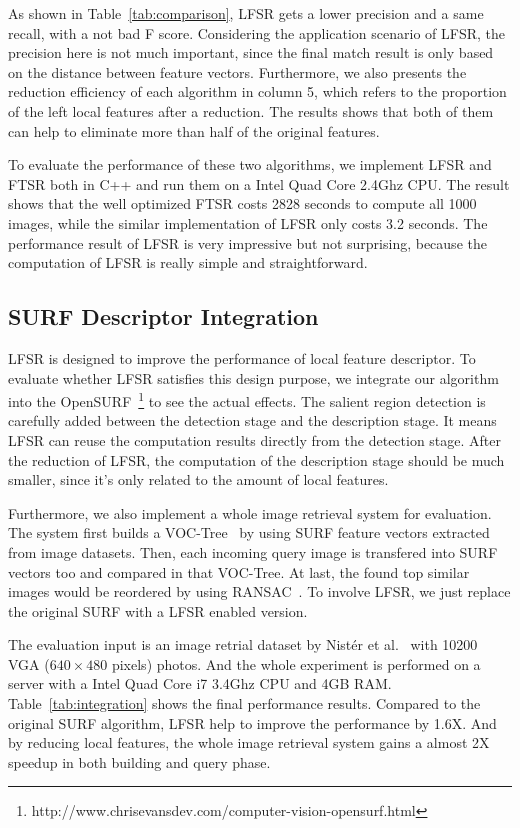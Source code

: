 As shown in Table~\ref{tab:comparison}, LFSR gets a lower precision and a same recall, with a not bad F score. Considering the application scenario of LFSR, the precision here is not much important, since the final match result is only based on the distance between feature vectors. Furthermore, we also presents the reduction efficiency of each algorithm in column 5, which refers to the proportion of the left local features after a reduction. The results shows that both of them can help to eliminate more than half of the original features.

To evaluate the performance of these two algorithms, we implement LFSR and FTSR both in C++ and run them on a Intel Quad Core 2.4Ghz CPU. The result shows that the well optimized FTSR costs 2828 seconds to compute all 1000 images, while the similar implementation of LFSR only costs 3.2 seconds. The performance result of LFSR is very impressive but not surprising, because the computation of LFSR is really simple and straightforward.

\subsection{SURF Descriptor Integration}
\label{sec:evaluation_integration}

LFSR is designed to improve the performance of local feature descriptor. To evaluate whether LFSR satisfies this design purpose, we integrate our algorithm into the OpenSURF~\footnote{http://www.chrisevansdev.com/computer-vision-opensurf.html} to see the actual effects. The salient region detection is carefully added between the detection stage and the description stage. It means LFSR can reuse the computation results directly from the detection stage. After the reduction of LFSR, the computation of the description stage should be much smaller, since it's only related to the amount of local features.

Furthermore, we also implement a whole image retrieval system for evaluation. The system first builds a VOC-Tree~\cite{VOCTree2006} by using SURF feature vectors extracted from image datasets. Then, each incoming query image is transfered into SURF vectors too and compared in that VOC-Tree. At last, the found top similar images would be reordered by using RANSAC~\cite{ransac1981}. To involve LFSR, we just replace the original SURF with a LFSR enabled version.

The evaluation input is an image retrial dataset by Nist\'er et al.~\cite{nister-stewenius-cvpr-2006} with 10200 VGA ($640\times480$ pixels) photos. And the whole experiment is performed on a server with a Intel Quad Core i7 3.4Ghz CPU and 4GB RAM. Table~\ref{tab:integration} shows the final performance results. Compared to the original SURF algorithm, LFSR help to improve the performance by 1.6X. And by reducing local features, the whole image retrieval system gains a almost 2X speedup in both building and query phase.

